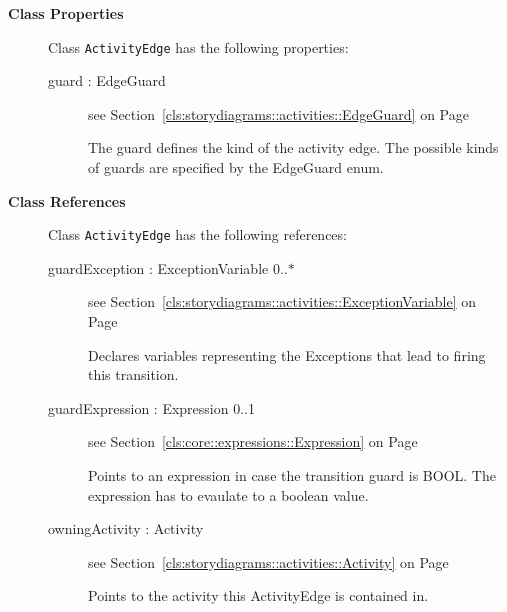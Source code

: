 \begin{description}

	\item[\textbf{Class Properties}] Class \texttt{ActivityEdge} has the following properties:
	\begin{description}
\item[guard : EdgeGuard 	]
see Section~\ref{cls:storydiagrams::activities::EdgeGuard} on Page~\pageref{cls:storydiagrams::activities::EdgeGuard}
\hspace{\fill}
\nopagebreak


	
			
The guard defines the kind of the activity edge. The possible kinds of guards are specified by the EdgeGuard enum.	
		
	
	\end{description}
	
	\item[\textbf{Class References}] Class \texttt{ActivityEdge} has the following references:
	\begin{description}
\item[guardException : ExceptionVariable 			0..$*$]
see Section~\ref{cls:storydiagrams::activities::ExceptionVariable} on Page~\pageref{cls:storydiagrams::activities::ExceptionVariable}
\hspace{\fill}
\nopagebreak


	
			
Declares variables representing the Exceptions that lead to firing this transition.	
		
	
\item[guardExpression : Expression 			0..1]
see Section~\ref{cls:core::expressions::Expression} on Page~\pageref{cls:core::expressions::Expression}
\hspace{\fill}
\nopagebreak


	
			
Points to an expression in case the transition guard is BOOL. The expression has to evaulate to a boolean value.	
		
	
\item[owningActivity : Activity 	]
see Section~\ref{cls:storydiagrams::activities::Activity} on Page~\pageref{cls:storydiagrams::activities::Activity}
\hspace{\fill}
\nopagebreak


	
			
Points to the activity this ActivityEdge is contained in.	
		

\end{description}
\end{description}
